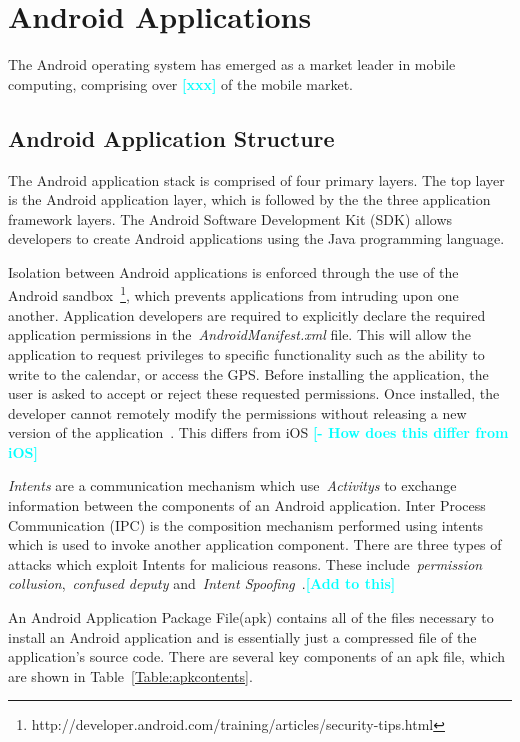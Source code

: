 \documentclass{sig-alternate}
\newcommand{\todo}[1]{\textcolor{cyan}{\textbf{[#1]}}}
\begin{document}
\label{sec: androidapplications}
\section{Android Applications}

The Android operating system has emerged as a market leader in mobile computing, comprising over \todo{xxx} of the mobile market.


\subsection{Android Application Structure}

The Android application stack is comprised of four primary layers. The top layer is the Android application layer, which is followed by the the three application framework layers. The Android Software Development Kit (SDK) allows developers to create Android applications using the Java programming language.

Isolation between Android applications is enforced through the use of the Android sandbox~\footnote{http://developer.android.com/training/articles/security-tips.html}, which prevents applications from intruding upon one another. Application developers are required to explicitly declare the required application permissions in the~\emph{AndroidManifest.xml} file. This will allow the application to request privileges to specific functionality such as the ability to write to the calendar, or access the GPS. Before installing the application, the user is asked to accept or reject these requested permissions. Once installed, the developer cannot remotely modify the permissions without releasing a new version of the application~\cite{shaerpour2013trends}. This differs from iOS \todo{- How does this differ from iOS}


\emph{Intents} are a communication mechanism which use~\emph{Activitys} to exchange information between the components of an Android application. Inter Process Communication (IPC) is the composition mechanism performed using intents which is used to invoke another application component. There are three types of attacks which exploit Intents for malicious reasons. These include~\emph{permission collusion},~\emph{confused deputy} and~\emph{Intent Spoofing}~\cite{6641043}.\todo{Add to this}



An Android Application Package File(apk) contains all of the files necessary to install an Android application and is essentially just a compressed file of the application's source code. There are several key components of an apk file, which are shown in Table~\ref{Table:apkcontents}.
\end{document}
